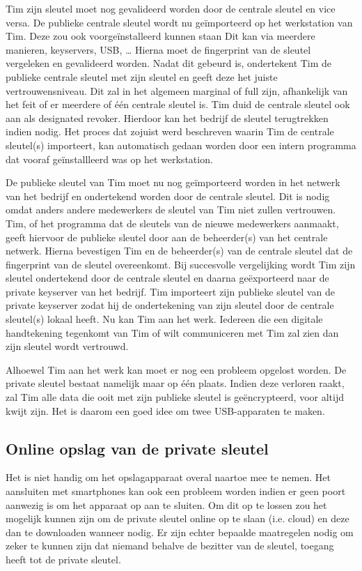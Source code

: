 Tim zijn sleutel moet nog gevalideerd worden door de centrale sleutel en vice
versa. De publieke centrale sleutel wordt nu geïmporteerd op het werkstation van
Tim. Deze zou ook voorgeïnstalleerd kunnen staan  Dit kan via meerdere manieren,
keyservers, USB, … Hierna moet de fingerprint van de sleutel vergeleken en
gevalideerd worden. Nadat dit gebeurd is, ondertekent Tim de publieke centrale
sleutel met zijn sleutel en geeft deze het juiste vertrouwensniveau. Dit zal in
het algemeen marginal of full zijn, afhankelijk van het feit of er meerdere of
één centrale sleutel is. Tim duid de centrale sleutel ook aan als designated
revoker. Hierdoor kan het bedrijf de sleutel terugtrekken indien nodig. Het
proces dat zojuist werd beschreven waarin Tim de centrale sleutel(s) importeert,
kan automatisch gedaan worden door een intern programma dat vooraf
geïnstallleerd was op het werkstation.

De publieke sleutel van Tim moet nu nog geïmporteerd worden in het netwerk van
het bedrijf en ondertekend worden door de centrale sleutel. Dit is nodig omdat
anders andere medewerkers de sleutel van Tim niet zullen vertrouwen. Tim, of het
programma dat de sleutels van de nieuwe medewerkers aanmaakt, geeft hiervoor de
publieke sleutel door aan de beheerder(s) van het centrale netwerk. Hierna
bevestigen Tim en de beheerder(s) van de centrale sleutel dat de fingerprint van
de sleutel overeenkomt. Bij succesvolle vergelijking wordt Tim zijn sleutel
ondertekend door de centrale sleutel en daarna geëxporteerd naar de private
keyserver van het bedrijf. Tim importeert zijn publieke sleutel van de private
keyserver zodat hij de ondertekening van zijn sleutel door de centrale
sleutel(s) lokaal heeft. Nu kan Tim aan het werk. Iedereen die een digitale
handtekening tegenkomt van Tim of wilt communiceren met Tim zal zien dan zijn
sleutel wordt vertrouwd.

Alhoewel Tim aan het werk kan moet er nog een probleem opgelost worden. De
private sleutel bestaat namelijk maar op één plaats. Indien deze verloren raakt,
zal Tim alle data die ooit met zijn publieke sleutel is geëncrypteerd, voor
altijd kwijt zijn. Het is daarom een goed idee om twee USB-apparaten te maken.

\subsection{Online opslag van de private sleutel}
\label{subsec:online-opslag-van-de-private-sleutel}

Het is niet handig om het opslagapparaat overal naartoe mee te nemen. Het
aansluiten met smartphones kan ook een probleem worden indien er geen poort
aanwezig is om het apparaat op aan te sluiten. Om dit op te lossen zou het
mogelijk kunnen zijn om de private sleutel online op te slaan (i.e. cloud) en
deze dan te downloaden wanneer nodig. Er zijn echter bepaalde maatregelen nodig
om zeker te kunnen zijn dat niemand behalve de bezitter van de sleutel, toegang
heeft tot de private sleutel.

